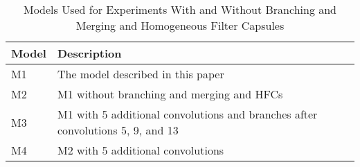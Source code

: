 \documentclass{article}
\begin{document}
\begin{table}[!htbp]
  \caption{Models Used for Experiments With and Without Branching and Merging and Homogeneous Filter Capsules}
  \centering
  \begin{tabularx}{\textwidth}{@{}lX@{}}
    \toprule
      Model & Description \\
    \midrule
      M1 & The model described in this paper \\
      M2 & M1 without branching and merging and HFCs \\
      M3 & M1 with 5 additional  convolutions and branches after convolutions 5, 9, and 13 \\
      M4 & M2 with 5 additional  convolutions \\
    \bottomrule
  \end{tabularx}\label{tab:additional_models}
\end{table}
\end{document}
